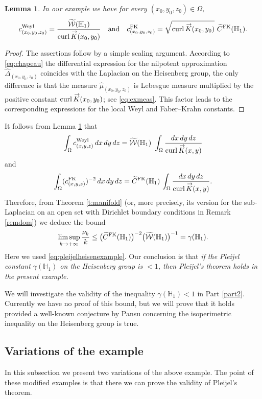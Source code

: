 \documentclass[JEP,XML,SOM,Unicode,published]{cedram}
\newcommand{\FK}{\textup{FK}}
\newcommand{\Weyl}{\textup{Weyl}}
\renewcommand{\vec}[1]
{\overset{\,{\raisebox{-2pt}{$\scriptstyle\to$}}}{#1}}
\newtheorem{lemma}[theorem]{Lemma}
\theoremstyle{definition}
\newcommand{\1}{\mathbbm{1}}
\begin{document}
\begin{lemma}\label{exampleconst}
In our example we have for every $(x_0,y_0,z_0)\in\Omega$,
\[
c^\Weyl_{(x_0,y_0,z_0)} = \frac{\widetilde{\mathcal W}(\mathbb H_1)}{\mathrm{curl}\,\vec{K}(x_0,y_0)}
\quad\text{and}\quad
c_{(x_0,y_0,z_0)}^\FK = \sqrt{\mathrm{curl}\,\vec{K}(x_0,y_0)} \ \widetilde C^\FK(\mathbb H_1).
\]
\end{lemma}

\begin{proof}
The assertions follow by a simple scaling argument. According to \eqref{eq:chapeau} the differential expression for the nilpotent approximation $\widehat\Delta_{(x_0,y_0,z_0)}$ coincides with the Laplacian on the Heisenberg group, the only difference is that the measure $\widehat\mu_{(x_0,y_0,z_0)}$ is Lebesgue measure multiplied by the positive constant $\mathrm{curl}\,\vec{K}(x_0,y_0)$; see \eqref{eq:exmeas}. This factor leads to the corresponding expressions for the local Weyl and Faber--Krahn constants.
\end{proof}

It follows from Lemma \ref{exampleconst} that
\[
\int_\Omega c^\Weyl_{(x,y,z)} \,dx\,dy\,dz = \widetilde{\mathcal W}(\mathbb H_1) \ \int_\Omega \frac{dx\,dy\,dz}{\text{curl}\,\vec{K}(x,y)}
\]
and
\[
\int_\Omega (c_{(x,y,z)}^\FK)^{-2} \,dx\,dy\,dz = \widetilde C^\FK(\mathbb H_1) \,\int_\Omega \frac{dx\,dy\,dz}{\text{curl}\,\vec{K}(x,y)}.
\]
Therefore, from Theorem \ref{t:manifold} (or, more precisely, its version for the sub-Laplacian on an open set with Dirichlet boundary conditions in Remark \ref{remdom}) we deduce the bound
\[
\limsup_{k\to+\infty} \frac{\nu_k}{k} \leq \bigl(\widetilde C^\FK(\mathbb H_1)\bigr)^{-2} \bigl(\widetilde{\mathcal W}(\mathbb H_1)\bigr)^{-1} = \gamma(\mathbb H_1).
\]
Here we used \eqref{eq:pleijelheisenexample}. Our conclusion is that \emph{if the Pleijel constant $\gamma(\mathbb H_1)$ on the Heisenberg group is $<1$, then Pleijel's theorem holds in the present example.}

We will investigate the validity of the inequality $\gamma(\mathbb H_1)<1$ in Part \ref{part2}. Currently we have no proof of this bound, but we will prove that it holds provided a well-known conjecture by Pansu concerning the isoperimetric inequality on the Heisenberg group is true.

\subsection{Variations of the example}
In this subsection we present two variations of the above example. The point of these modified examples is that there we can prove the validity of Pleijel's theorem.
\end{document}

